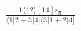 \documentclass[varwidth, border=5pt]{standalone}
\begin{document}
\begin{my}
$\begin{gathered}
\scriptscriptstyle\frac{1⟨12⟩[14]s_{𝟓}}{⟨1|2+3|4]⟨3|1+2|4]}
\end{gathered}$
\end{my}
\end{document}
